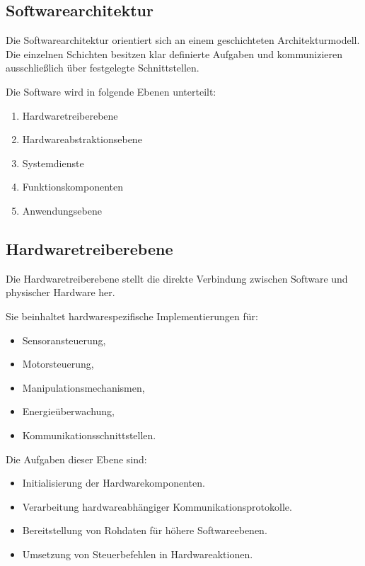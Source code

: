 \documentclass[
  a4paper,
  12pt,
  DIV=12,        %
  parskip=half,  %
  headings=small %
]{scrartcl}
\theoremstyle{definition}
\providecommand{\tightlist}{%
  \setlength{\itemsep}{0pt}\setlength{\parskip}{0pt}}
\theoremstyle{definition}
\begin{document}
\subsection{Softwarearchitektur}\label{softwarearchitektur}

Die Softwarearchitektur orientiert sich an einem geschichteten
Architekturmodell. Die einzelnen Schichten besitzen klar definierte
Aufgaben und kommunizieren ausschließlich über festgelegte
Schnittstellen.

Die Software wird in folgende Ebenen unterteilt:

\begin{enumerate}
\def\labelenumi{\arabic{enumi}.}
\tightlist
\item
  Hardwaretreiberebene
\item
  Hardwareabstraktionsebene
\item
  Systemdienste
\item
  Funktionskomponenten
\item
  Anwendungsebene
\end{enumerate}

\subsection{Hardwaretreiberebene}\label{hardwaretreiberebene}

Die Hardwaretreiberebene stellt die direkte Verbindung zwischen Software
und physischer Hardware her.

Sie beinhaltet hardwarespezifische Implementierungen für:

\begin{itemize}
\tightlist
\item
  Sensoransteuerung,
\item
  Motorsteuerung,
\item
  Manipulationsmechanismen,
\item
  Energieüberwachung,
\item
  Kommunikationsschnittstellen.
\end{itemize}

Die Aufgaben dieser Ebene sind:

\begin{itemize}
\tightlist
\item
  Initialisierung der Hardwarekomponenten.
\item
  Verarbeitung hardwareabhängiger Kommunikationsprotokolle.
\item
  Bereitstellung von Rohdaten für höhere Softwareebenen.
\item
  Umsetzung von Steuerbefehlen in Hardwareaktionen.
\end{itemize}
\end{document}

